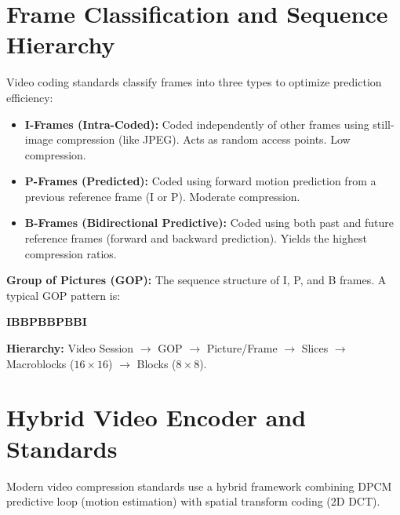 \documentclass[12pt,a4paper]{article}
\begin{document}
\section{Frame Classification and Sequence Hierarchy}

Video coding standards classify frames into three types to optimize prediction efficiency:
\begin{itemize}[leftmargin=*, itemsep=3.5pt]
  \item \textbf{I-Frames (Intra-Coded):} Coded independently of other frames using still-image compression (like JPEG). Acts as random access points. Low compression.
  \item \textbf{P-Frames (Predicted):} Coded using forward motion prediction from a previous reference frame (I or P). Moderate compression.
  \item \textbf{B-Frames (Bidirectional Predictive):} Coded using both past and future reference frames (forward and backward prediction). Yields the highest compression ratios.
\end{itemize}

\begin{tcolorbox}[defbox, title={Video Sequence Structure}]
\textbf{Group of Pictures (GOP):} The sequence structure of I, P, and B frames. A typical GOP pattern is:
\begin{center}
  \textbf{I\quad B\quad B\quad P\quad B\quad B\quad P\quad B\quad B\quad I}
\end{center}
\par\noindent
\textbf{Hierarchy:} Video Session $\rightarrow$ GOP $\rightarrow$ Picture/Frame $\rightarrow$ Slices $\rightarrow$ Macroblocks ($16\times16$) $\rightarrow$ Blocks ($8\times8$).
\end{tcolorbox}

\section{Hybrid Video Encoder and Standards}

Modern video compression standards use a hybrid framework combining DPCM predictive loop (motion estimation) with spatial transform coding (2D DCT).
\end{document}
